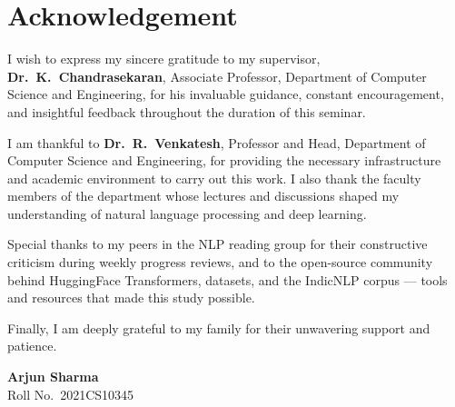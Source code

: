 \chapter*{Acknowledgement}

I wish to express my sincere gratitude to my supervisor, \textbf{Dr.\ K.\ Chandrasekaran}, Associate Professor, Department of Computer Science and Engineering, for his invaluable guidance, constant encouragement, and insightful feedback throughout the duration of this seminar.

I am thankful to \textbf{Dr.\ R.\ Venkatesh}, Professor and Head, Department of Computer Science and Engineering, for providing the necessary infrastructure and academic environment to carry out this work. I also thank the faculty members of the department whose lectures and discussions shaped my understanding of natural language processing and deep learning.

Special thanks to my peers in the NLP reading group for their constructive criticism during weekly progress reviews, and to the open-source community behind HuggingFace Transformers, datasets, and the IndicNLP corpus — tools and resources that made this study possible.

Finally, I am deeply grateful to my family for their unwavering support and patience.

\vspace{12pt}
\begin{flushright}
\textbf{Arjun Sharma}\\[2pt]
{\small\color{graytext} Roll No.\ 2021CS10345}
\end{flushright}

\tableofcontents
\clearpage

